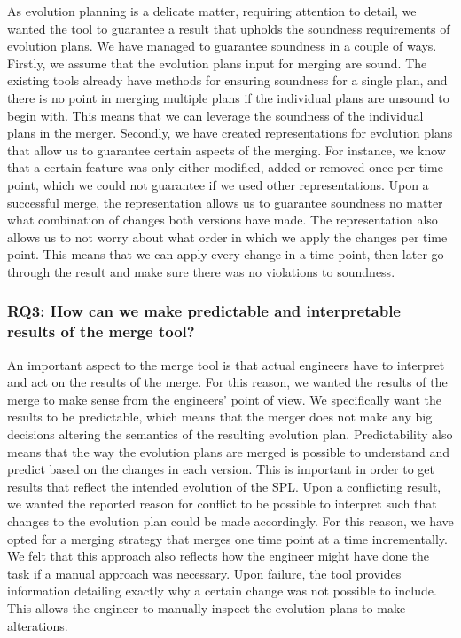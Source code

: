 \documentclass[a4paper,english]{ifimaster}
\begin{document}
As evolution planning is a delicate matter, requiring attention to detail, we wanted the tool to guarantee a result that upholds the soundness requirements of evolution plans. We have managed to guarantee soundness in a couple of ways. Firstly, we assume that the evolution plans input for merging are sound. The existing tools already have methods for ensuring soundness for a single plan, and there is no point in merging multiple plans if the individual plans are unsound to begin with. This means that we can leverage the soundness of the individual plans in the merger. Secondly, we have created representations for evolution plans that allow us to guarantee certain aspects of the merging. For instance, we know that a certain feature was only either modified, added or removed once per time point, which we could not guarantee if we used other representations. Upon a successful merge, the representation allows us to guarantee soundness no matter what combination of changes both versions have made. The representation also allows us to not worry about what order in which we apply the changes per time point. This means that we can apply every change in a time point, then later go through the result and make sure there was no violations to soundness.

\subsubsection{RQ3: How can we make predictable and interpretable results of the merge tool?}

An important aspect to the merge tool is that actual engineers have to interpret and act on the results of the merge. For this reason, we wanted the results of the merge to make sense from the engineers' point of view. We specifically want the results to be predictable, which means that the merger does not make any big decisions altering the semantics of the resulting evolution plan. Predictability also means that the way the evolution plans are merged is possible to understand and predict based on the changes in each version. This is important in order to get results that reflect the intended evolution of the SPL. Upon a conflicting result, we wanted the reported reason for conflict to be possible to interpret such that changes to the evolution plan could be made accordingly. For this reason, we have opted for a merging strategy that merges one time point at a time incrementally. We felt that this approach also reflects how the engineer might have done the task if a manual approach was necessary. Upon failure, the tool provides information detailing exactly why a certain change was not possible to include. This allows the engineer to manually inspect the evolution plans to make alterations.
\end{document}
